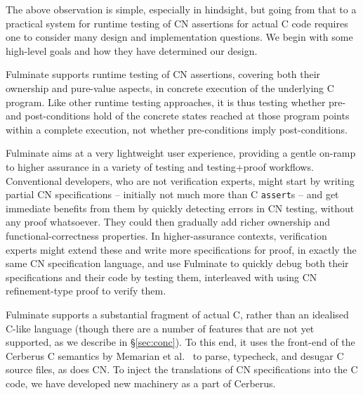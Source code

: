 \documentclass[withindex,glossary]{cam-thesis}
\begin{document}
{\color{red}
The above observation is simple, especially in hindsight, but going from that to a practical system for runtime testing of CN assertions for actual C code requires one to consider many design and implementation questions. 
%
We begin with some high-level goals and how they have determined our design.


Fulminate supports runtime testing of CN assertions, covering both their ownership and pure-value aspects,
in concrete execution of the underlying C program.
%
Like other runtime testing approaches, it is thus testing whether pre- and post-conditions hold of the concrete states reached at those program points within a complete execution, not whether pre-conditions imply post-conditions.

Fulminate aims at a very lightweight user experience, providing a gentle on-ramp to higher assurance in a variety of testing and testing+proof workflows.
Conventional developers, who are not verification experts, might start by writing partial CN specifications
-- initially not much more than C \lstinline{assert}s --
and get immediate benefits from them by quickly detecting errors in CN testing, without any proof whatsoever. They could then gradually add richer ownership and functional-correctness properties.
In higher-assurance contexts, verification experts might extend these and write more specifications for proof, in exactly the same CN specification language, and use Fulminate to
quickly debug both their specifications and their code by testing them, interleaved with using CN refinement-type proof to verify them. 

Fulminate supports a substantial fragment of actual C, rather than an idealised C-like language (though there are a number of features that are not yet supported, as we describe in \S\ref{sec:conc}).
To this end, it uses the front-end of the Cerberus C semantics by Memarian et al.~\cite{CerberusPLDI16,cerberus-popl2019,UCAM-CL-TR-981} to parse, typecheck, and desugar C source files, as does CN.
To inject the translations of CN specifications into the C code, we have developed new machinery as a part of Cerberus.



}
\end{document}
